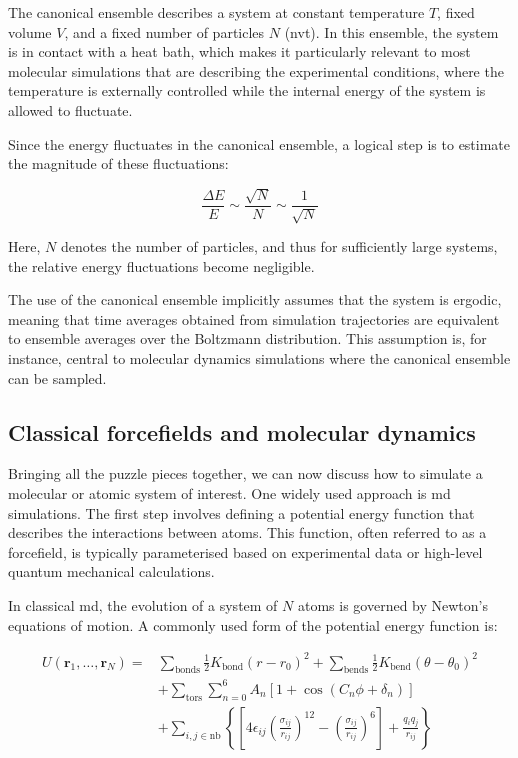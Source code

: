 The canonical ensemble describes a system at constant temperature $T$, fixed volume $V$, and a fixed number of particles $N$ (\acs{nvt}). In this ensemble, the system is in contact with a heat bath, which makes it particularly relevant to most molecular simulations that are describing the experimental conditions, where the temperature is externally controlled while the internal energy of the system is allowed to fluctuate.

Since the energy fluctuates in the canonical ensemble, a logical step is to estimate the magnitude of these fluctuations:

\begin{equation}
    \frac{\Delta E}{E} \sim \frac{\sqrt{N}}{N} \sim \frac{1}{\sqrt{N}}
\end{equation}

Here, $N$ denotes the number of particles, and thus for sufficiently large systems, the relative energy fluctuations become negligible.

The use of the canonical ensemble implicitly assumes that the system is ergodic, meaning that time averages obtained from simulation trajectories are equivalent to ensemble averages over the Boltzmann distribution. This assumption is, for instance, central to molecular dynamics simulations where the canonical ensemble can be sampled.



\subsection{Classical forcefields and molecular dynamics}
Bringing all the puzzle pieces together, we can now discuss how to simulate a molecular or atomic system of interest. One widely used approach is \ac{md} simulations. The first step involves defining a potential energy function that describes the interactions between atoms. This function, often referred to as a forcefield, is typically parameterised based on experimental data or high-level quantum mechanical calculations.

In classical \ac{md}, the evolution of a system of $N$ atoms is governed by Newton's equations of motion. A commonly used form of the potential energy function is:

\begin{equation}
\begin{aligned}
    U(\mathbf{r}_1, \dots, \mathbf{r}_N) = &\sum_{\text{bonds}} \frac{1}{2} K_{\text{bond}} (r - r_0)^2 + 
    \sum_{\text{bends}} \frac{1}{2} K_{\text{bend}} (\theta - \theta_0)^2 \\
    &+ \sum_{\text{tors}} \sum_{n=0}^{6} A_n \left[ 1 + \cos(C_n \phi + \delta_n) \right] \\
    &+ \sum_{i,j \in \text{nb}} \left\{ \left[ 4\epsilon_{ij} \left( \frac{\sigma_{ij}}{r_{ij}} \right)^{12}
    - \left( \frac{\sigma_{ij}}{r_{ij}} \right)^6 \right] + \frac{q_i q_j}{r_{ij}} \right\}
\end{aligned}
\label{eq:md_potential}
\end{equation}

